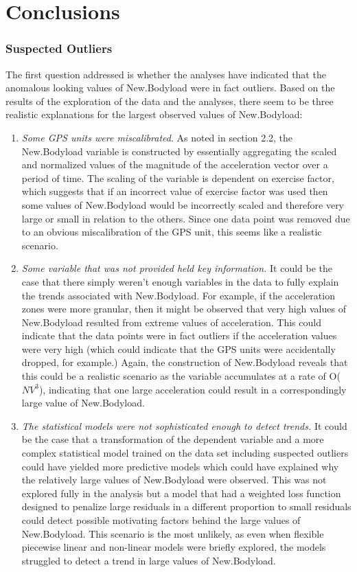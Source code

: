 \section{Conclusions}
\subsubsection{Suspected Outliers}
The first question addressed is whether the analyses have indicated that the anomalous looking values of New.Bodyload were in fact outliers. Based on the results of the exploration of the data and the analyses, there seem to be three realistic explanations for the largest observed values of New.Bodyload: 
\begin{enumerate}
	\item \emph{Some GPS units were miscalibrated}. As noted in section 2.2, the New.Bodyload variable is constructed by essentially aggregating the scaled and normalized values of the magnitude of the acceleration vector over a period of time. The scaling of the variable is dependent on exercise factor, which suggests that if an incorrect value of exercise factor was used then some values of New.Bodyload would be incorrectly scaled and therefore very large or small in relation to the others. Since one data point was removed due to an obvious miscalibration of the GPS unit, this seems like a realistic scenario.
	
	\item \emph{Some variable that was not provided held key information.} It could be the case that there simply weren't enough variables in the data to fully explain the trends associated with New.Bodyload. For example, if the acceleration zones were more granular, then it might be observed that very high values of New.Bodyload resulted from extreme values of acceleration. This could indicate that the data points were in fact outliers if the acceleration values were very high (which could indicate that the GPS units were accidentally dropped, for example.) Again, the construction of New.Bodyload reveals that this could be a realistic scenario as the variable accumulates at a rate of O($NV^3$), indicating that one large acceleration could result in a correspondingly large value of New.Bodyload.
	
	\item \emph{The statistical models were not sophisticated enough to detect trends.} It could be the case that a transformation of the dependent variable and a more complex statistical model trained on the data set including suspected outliers could have yielded more predictive models which could have explained why the relatively large values of New.Bodyload were observed. This was not explored fully in the analysis but a model that had a weighted loss function designed to penalize large residuals in a different proportion to small residuals could detect possible motivating factors behind the large values of New.Bodyload. This scenario is the most unlikely, as even when flexible piecewise linear and non-linear models were briefly explored, the models struggled to detect a trend in large values of New.Bodyload.
\end{enumerate}
